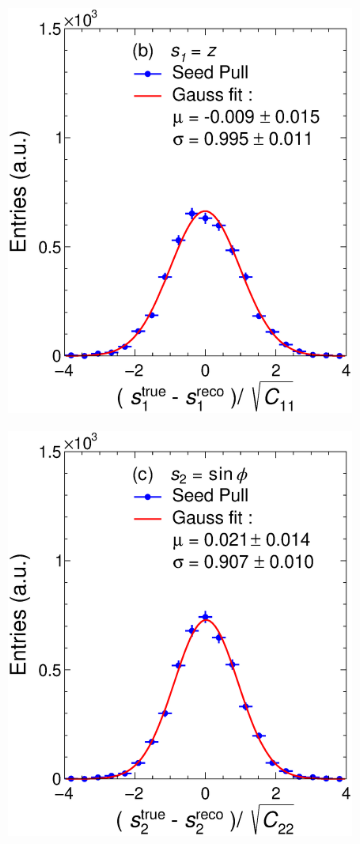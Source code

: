 \begin{figure}[t]
\begin{subfigure}{0.32\textwidth}
         \includegraphics[width=\textwidth]{figures/ch4-KF_NDGArLite/Toy/Corr/UnitSeed_p1.eps}
         \caption{}
         \label{fig:resp1Seed_GArLite_Corr}
     \end{subfigure}
    \begin{subfigure}{0.32\textwidth}
         \centering
         \includegraphics[width=\textwidth]{figures/ch4-KF_NDGArLite/Toy/Corr/UnitSeed_p2.eps}

\end{subfigure}
\end{figure}
